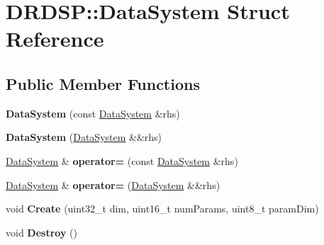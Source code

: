 \hypertarget{struct_d_r_d_s_p_1_1_data_system}{\section{D\-R\-D\-S\-P\-:\-:Data\-System Struct Reference}
\label{struct_d_r_d_s_p_1_1_data_system}
}
\subsection*{Public Member Functions}
\begin{DoxyCompactItemize}
\item 
\hypertarget{struct_d_r_d_s_p_1_1_data_system_a3932e5e343441907adbe5c88e9aa6c2f}{{\bfseries Data\-System} (const \hyperlink{struct_d_r_d_s_p_1_1_data_system}{Data\-System} \&rhs)}\label{struct_d_r_d_s_p_1_1_data_system_a3932e5e343441907adbe5c88e9aa6c2f}

\item 
\hypertarget{struct_d_r_d_s_p_1_1_data_system_afcb0f2f09041d9c5ce8ebf35babb0782}{{\bfseries Data\-System} (\hyperlink{struct_d_r_d_s_p_1_1_data_system}{Data\-System} \&\&rhs)}\label{struct_d_r_d_s_p_1_1_data_system_afcb0f2f09041d9c5ce8ebf35babb0782}

\item 
\hypertarget{struct_d_r_d_s_p_1_1_data_system_a5294fc0909f5346ea51016efa37b9fc5}{\hyperlink{struct_d_r_d_s_p_1_1_data_system}{Data\-System} \& {\bfseries operator=} (const \hyperlink{struct_d_r_d_s_p_1_1_data_system}{Data\-System} \&rhs)}\label{struct_d_r_d_s_p_1_1_data_system_a5294fc0909f5346ea51016efa37b9fc5}

\item 
\hypertarget{struct_d_r_d_s_p_1_1_data_system_aea74462f4d4dcabd599d85ec2db9a11d}{\hyperlink{struct_d_r_d_s_p_1_1_data_system}{Data\-System} \& {\bfseries operator=} (\hyperlink{struct_d_r_d_s_p_1_1_data_system}{Data\-System} \&\&rhs)}\label{struct_d_r_d_s_p_1_1_data_system_aea74462f4d4dcabd599d85ec2db9a11d}

\item 
\hypertarget{struct_d_r_d_s_p_1_1_data_system_a22dbffce42551aa598d9b5b763253e21}{void {\bfseries Create} (uint32\-\_\-t dim, uint16\-\_\-t num\-Params, uint8\-\_\-t param\-Dim)}\label{struct_d_r_d_s_p_1_1_data_system_a22dbffce42551aa598d9b5b763253e21}

\item 
\hypertarget{struct_d_r_d_s_p_1_1_data_system_a584d7c384388bc0fd6cda08aa50fc1cd}{void {\bfseries Destroy} ()}\label{struct_d_r_d_s_p_1_1_data_system_a584d7c384388bc0fd6cda08aa50fc1cd}


\end{DoxyCompactItemize}
